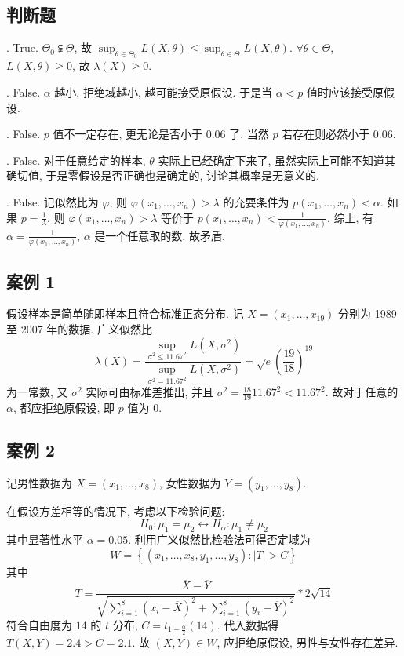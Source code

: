\documentclass[\ROOT/main.tex]{subfiles}
\begin{document}
\subsection{判断题}
.
True. $\Theta_0 \subsetneqq \Theta$,
故 $\sup_{\theta \in \Theta_0} L \left( X, \theta \right)
\leqslant \sup_{\theta \in \Theta} L \left( X, \theta \right)$.
$\forall \theta \in \Theta$, $L \left( X, \theta \right) \geqslant 0$, 故 $\lambda \left( X \right) \geqslant 0$.

.
False. $\alpha$ 越小, 拒绝域越小, 越可能接受原假设.
于是当 $\alpha < p$ 值时应该接受原假设. 

.
False. $p$ 值不一定存在, 更无论是否小于 $0.06$ 了. 当然 $p$ 若存在则必然小于 $0.06$.

.
False. 对于任意给定的样本, $\theta$ 实际上已经确定下来了, 虽然实际上可能不知道其确切值, 于是零假设是否正确也是确定的, 讨论其概率是无意义的.

.
False. 记似然比为 $\varphi$, 则 $\varphi \left( x_1, \dots, x_n \right) > \lambda$ 的充要条件为 $p \left( x_1, \dots , x_n \right) < \alpha$.
如果 $p = \frac{1}{\lambda}$, 则 $\varphi \left( x_1, \dots, x_n \right) > \lambda$ 等价于 $p \left( x_1, \dots, x_n \right) < \frac{1}{\varphi \left( x_1, \dots, x_n \right)}$.
综上, 有 $\alpha = \frac{1}{\varphi \left( x_1, \dots, x_n \right)}$, $\alpha$ 是一个任意取的数, 故矛盾.

\subsection{案例 1}
假设样本是简单随即样本且符合标准正态分布.
记 $X = \left( x_1, \dots, x_{19} \right)$ 分别为 1989 至 2007 年的数据.
广义似然比
\[
    \lambda \left( X \right)
    = \frac{\displaystyle\sup_{\sigma^2 \leqslant 11.67^2} L \left( X, \sigma^2 \right)}{\displaystyle\sup_{\sigma^2 = 11.67^2} L \left( X, \sigma^2 \right)}
    = \sqrt{e} \left( \frac{19}{18} \right)^{19}
\]
为一常数, 又 $\sigma^2$ 实际可由标准差推出, 并且 $\sigma^2 = \frac{18}{19} 11.67^2 < 11.67^2$.
故对于任意的 $\alpha$, 都应拒绝原假设, 即 $p$ 值为 $0$.

\subsection{案例 2}
记男性数据为 $X = \left( x_1, \dots, x_8 \right)$, 女性数据为 $Y = \left( y_1, \dots, y_8 \right)$.

在假设方差相等的情况下, 考虑以下检验问题:
\[
    H_0: \mu_1 = \mu_2 \leftrightarrow H_\alpha: \mu_1 \neq \mu_2
\]
其中显著性水平 $\alpha = 0.05$.
利用广义似然比检验法可得否定域为
\[
    W = \left\{
        \left( x_1, \dots, x_8, y_1, \dots, y_8 \right) : \left| T \right| > C
    \right\}
\]
其中
\[
    T = \frac{\overline{X} - \overline{Y}}{\sqrt{\sum_{i = 1}^{8} \left( x_i - \overline{X} \right)^2 + \sum_{i = 1}^{8} \left( y_i - \overline{Y} \right)^2}} * 2 \sqrt{14}
\]
符合自由度为 $14$ 的 $t$ 分布, $C = t_{1 - \frac{\alpha}{2}} \left( 14 \right)$.
代入数据得 $T \left( X, Y \right) = 2.4 > C = 2.1$.
故 $(X, Y) \in W$, 应拒绝原假设, 男性与女性存在差异.
\end{document}
